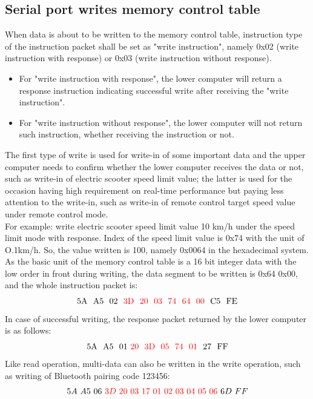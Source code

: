 \documentclass[binding=0.6cm,LaM,noexaminfo]{sapthesis}
\begin{document}
\subsection{Serial port writes memory control table}
When data is about to be written to the memory control table, instruction type of the instruction packet shall be set as "write instruction", namely 0x02 (write instruction with response) or 0x03 (write instruction without response). 
\begin{itemize}[noitemsep, topsep=0pt]
    \item For "write instruction with response", the lower computer will return a response instruction indicating successful write after receiving the "write instruction".
    \item For "write instruction without response", the lower computer will not return such instruction, whether receiving the instruction or not.
\end{itemize}
The first type of write is used for write-in of some important data and the upper computer needs to confirm whether the lower computer receives the data or not, such as write-in of electric scooter speed limit value; the latter is used for the occasion having high requirement on real-time performance but paying less attention to the write-in, such as write-in of remote control target speed value under remote control mode.\\
For example: write electric scooter speed limit value 10 km/h under the speed limit mode with response. Index of the speed limit value is 0x74 with the unit of O.1km/h. So, the value written is 100, namely 0x0064 in the hexadecimal system. As the basic unit of the memory control table is a 16 bit integer data with the low order in front during writing, the data segment to be written is 0x64 0x00, and the whole instruction packet is:
\begin{equation*}
    \text{5A \ A5 \ 02 \ \textcolor{red}{3D \ 20 \ 03 \ 74 \ 64 \ 00 }\ C5 \ FE}
\end{equation*}
In case of successful writing, the response packet returned by the lower computer is as follows:
\begin{equation*}
    \text{5A \ A5 \ 01 \textcolor{red}{20 \ 3D \ 05 \ 74 \ 01 }\ 27 \ FF}
\end{equation*}
Like read operation, multi-data can also be written in the write operation, such as writing of Bluetooth pairing code 123456:
\begin{equation*}
    5A \ A5 \ 06 \ \textcolor{red}{3D \ 20 \ 03 \ 17 \ 01 \ 02 \ 03 \ 04 \ 05 \ 06 \ } 6D \ FF 
\end{equation*}
\end{document}
